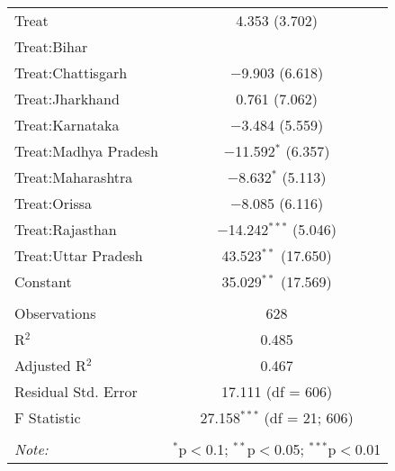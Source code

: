 
\begin{table}[!htbp] \centering 
\begin{tabular}{@{\extracolsep{5pt}}lc} 
\\[-1.8ex]\hline 
 Treat & 4.353 (3.702) \\ 
  Treat:Bihar &  \\ 
  Treat:Chattisgarh & $-$9.903 (6.618) \\ 
  Treat:Jharkhand & 0.761 (7.062) \\ 
  Treat:Karnataka & $-$3.484 (5.559) \\ 
  Treat:Madhya Pradesh & $-$11.592$^{*}$ (6.357) \\ 
  Treat:Maharashtra & $-$8.632$^{*}$ (5.113) \\ 
  Treat:Orissa & $-$8.085 (6.116) \\ 
  Treat:Rajasthan & $-$14.242$^{***}$ (5.046) \\ 
  Treat:Uttar Pradesh & 43.523$^{**}$ (17.650) \\ 
  Constant & 35.029$^{**}$ (17.569) \\ 
 \hline \\[-1.8ex] 
Observations & 628 \\ 
R$^{2}$ & 0.485 \\ 
Adjusted R$^{2}$ & 0.467 \\ 
Residual Std. Error & 17.111 (df = 606) \\ 
F Statistic & 27.158$^{***}$ (df = 21; 606) \\ 
\hline 
\hline \\[-1.8ex] 
\textit{Note:}  & \multicolumn{1}{r}{$^{*}$p$<$0.1; $^{**}$p$<$0.05; $^{***}$p$<$0.01} \\ 
\end{tabular} 
\end{table} 

